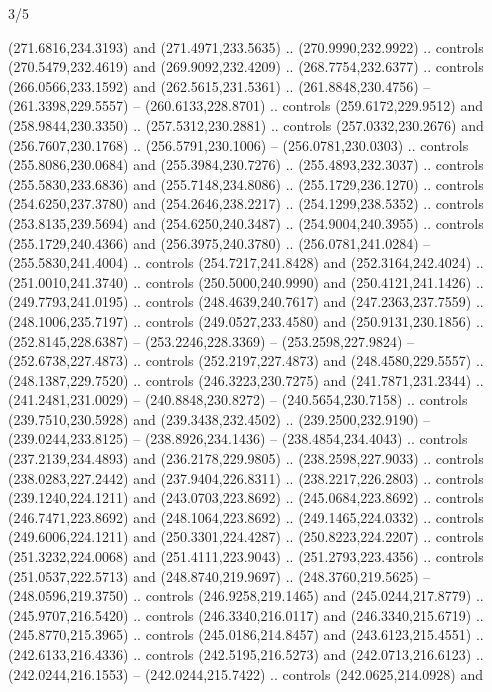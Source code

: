 \begin{flagdescription}{3/5}
\begin{scope}[xshift=0.5\flaglength,yshift=0.5\flagwidth,scale=\flagwidth/270]
\begin{scope}[y=0.8pt, x=0.8pt, yscale=-1,shift={(-281.25,-168.75)}]
  (271.6816,234.3193) and (271.4971,233.5635) .. (270.9990,232.9922) .. controls
  (270.5479,232.4619) and (269.9092,232.4209) .. (268.7754,232.6377) .. controls
  (266.0566,233.1592) and (262.5615,231.5361) .. (261.8848,230.4756) --
  (261.3398,229.5557) -- (260.6133,228.8701) .. controls (259.6172,229.9512) and
  (258.9844,230.3350) .. (257.5312,230.2881) .. controls (257.0332,230.2676) and
  (256.7607,230.1768) .. (256.5791,230.1006) -- (256.0781,230.0303) .. controls
  (255.8086,230.0684) and (255.3984,230.7276) .. (255.4893,232.3037) .. controls
  (255.5830,233.6836) and (255.7148,234.8086) .. (255.1729,236.1270) .. controls
  (254.6250,237.3780) and (254.2646,238.2217) .. (254.1299,238.5352) .. controls
  (253.8135,239.5694) and (254.6250,240.3487) .. (254.9004,240.3955) .. controls
  (255.1729,240.4366) and (256.3975,240.3780) .. (256.0781,241.0284) --
  (255.5830,241.4004) .. controls (254.7217,241.8428) and (252.3164,242.4024) ..
  (251.0010,241.3740) .. controls (250.5000,240.9990) and (250.4121,241.1426) ..
  (249.7793,241.0195) .. controls (248.4639,240.7617) and (247.2363,237.7559) ..
  (248.1006,235.7197) .. controls (249.0527,233.4580) and (250.9131,230.1856) ..
  (252.8145,228.6387) -- (253.2246,228.3369) -- (253.2598,227.9824) --
  (252.6738,227.4873) .. controls (252.2197,227.4873) and (248.4580,229.5557) ..
  (248.1387,229.7520) .. controls (246.3223,230.7275) and (241.7871,231.2344) ..
  (241.2481,231.0029) -- (240.8848,230.8272) -- (240.5654,230.7158) .. controls
  (239.7510,230.5928) and (239.3438,232.4502) .. (239.2500,232.9190) --
  (239.0244,233.8125) -- (238.8926,234.1436) -- (238.4854,234.4043) .. controls
  (237.2139,234.4893) and (236.2178,229.9805) .. (238.2598,227.9033) .. controls
  (238.0283,227.2442) and (237.9404,226.8311) .. (238.2217,226.2803) .. controls
  (239.1240,224.1211) and (243.0703,223.8692) .. (245.0684,223.8692) .. controls
  (246.7471,223.8692) and (248.1064,223.8692) .. (249.1465,224.0332) .. controls
  (249.6006,224.1211) and (250.3301,224.4287) .. (250.8223,224.2207) .. controls
  (251.3232,224.0068) and (251.4111,223.9043) .. (251.2793,223.4356) .. controls
  (251.0537,222.5713) and (248.8740,219.9697) .. (248.3760,219.5625) --
  (248.0596,219.3750) .. controls (246.9258,219.1465) and (245.0244,217.8779) ..
  (245.9707,216.5420) .. controls (246.3340,216.0117) and (246.3340,215.6719) ..
  (245.8770,215.3965) .. controls (245.0186,214.8457) and (243.6123,215.4551) ..
  (242.6133,216.4336) .. controls (242.5195,216.5273) and (242.0713,216.6123) ..
  (242.0244,216.1553) -- (242.0244,215.7422) .. controls (242.0625,214.0928) and

\end{scope}
\end{scope}
\end{flagdescription}
